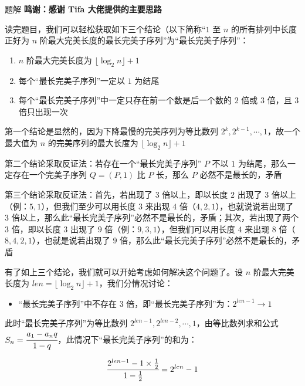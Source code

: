 \documentclass{pptt}
\begin{document}
\begin{frame}{题解}
    \textbf{鸣谢：感谢 Tifa 大佬提供的主要思路}

    \vspace{1cm}
    读完题目，我们可以轻松获取如下三个结论（以下简称“$1$ 至 $n$ 的所有排列中长度正好为 $n$ 阶最大完美长度的最长完美子序列”为“最长完美子序列”：

    \begin{enumerate}
        \item $n$ 阶最大完美长度为 $\lfloor \log_2 n \rfloor + 1$
        \item 每个“最长完美子序列”一定以 $1$ 为结尾
        \item 每个“最长完美子序列”中一定只存在前一个数是后一个数的 $2$ 倍或 $3$ 倍，且 $3$ 倍只出现一次
    \end{enumerate}
\end{frame}

\begin{frame}
    第一个结论是显然的，因为下降最慢的完美序列为等比数列 $2^k,2^{k-1},\cdots,1$，故一个最大值为 $n$ 的完美序列的最大长度为 $\lfloor \log_2 n \rfloor + 1$

    第二个结论采取反证法：若存在一个“最长完美子序列” $P$ 不以 $1$ 为结尾，那么一定存在一个完美子序列 $Q=(P,1)$ 比 $P$ 长，那么 $P$ 必然不是最长的，矛盾

    第三个结论采取反证法：首先，若出现了 $3$ 倍以上，即以长度 $2$ 出现了 $3$ 倍以上（例：$5,1$），但我们至少可以用长度 $3$ 来出现 $4$ 倍（$4,2,1$），也就说说若出现了 $3$ 倍以上，那么此“最长完美子序列”必然不是最长的，矛盾；其次，若出现了两个 $3$ 倍，即以长度 $3$ 出现了 $9$ 倍（例：$9,3,1$），但我们可以用长度 $4$ 来出现 $8$ 倍（$8,4,2,1$），也就是说若出现了 $9$ 倍，那么此“最长完美子序列”必然不是最长的，矛盾
\end{frame}

\begin{frame}
    有了如上三个结论，我们就可以开始考虑如何解决这个问题了。设 $n$ 阶最大完美长度为 $len=\lfloor \log_2 n \rfloor + 1$，我们分情况讨论：

    \begin{itemize} \item “最长完美子序列”中不存在 $3$ 倍，即“最长完美子序列”为：$2^{len-1} \rightarrow 1$ \end{itemize}

    此时“最长完美子序列”为等比数列 $2^{len-1},2^{len-2},\cdots,1$，由等比数列求和公式 $S_n=\cfrac{a_1-a_{n}q}{1-q}$，此情况下“最长完美子序列”的和为：

    $$\cfrac{2^{len-1}-1 \times \frac{1}{2}}{1-\frac{1}{2}}=2^{len}-1$$
\end{frame}
\end{document}
